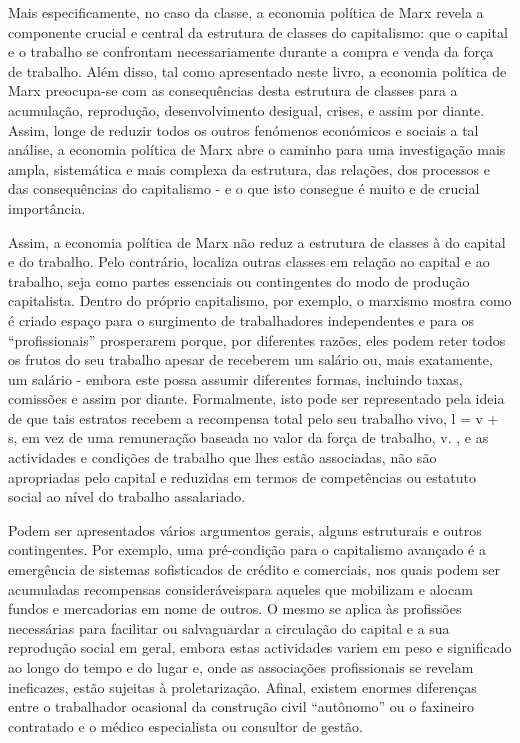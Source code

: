  \par 
Mais especificamente, no caso da classe, a economia política de Marx revela a componente crucial e central da estrutura de classes do capitalismo: que o capital e o trabalho se confrontam necessariamente durante a compra e venda da força de trabalho. Além disso, tal como apresentado neste livro, a economia política de Marx preocupa-se com as consequências desta estrutura de classes para a acumulação, reprodução, desenvolvimento desigual, crises, e assim por diante. Assim, longe de reduzir todos os outros fenómenos económicos e sociais a tal análise, a economia política de Marx abre o caminho para uma investigação mais ampla, sistemática e mais complexa da estrutura, das relações, dos processos e das consequências do capitalismo - e o que isto consegue é muito e de crucial importância.
 \par 
Assim, a economia política de Marx não reduz a estrutura de classes à do capital e do trabalho. Pelo contrário, localiza outras classes em relação ao capital e ao trabalho, seja como partes essenciais ou contingentes do modo de produção capitalista. Dentro do próprio capitalismo, por exemplo, o marxismo mostra como é criado espaço para o surgimento de trabalhadores independentes e para os “profissionais” prosperarem porque, por diferentes razões, eles podem reter todos os frutos do seu trabalho apesar de receberem um salário ou, mais exatamente, um salário - embora este possa assumir diferentes formas, incluindo taxas, comissões e assim por diante. Formalmente, isto pode ser representado pela ideia de que tais estratos recebem a recompensa total pelo seu trabalho vivo, l = v + s, em vez de uma remuneração baseada no valor da força de trabalho, v. , e as actividades e condições de trabalho que lhes estão associadas, não são apropriadas pelo capital e reduzidas em termos de competências ou estatuto social ao nível do trabalho assalariado.
 \par 
Podem ser apresentados vários argumentos gerais, alguns estruturais e outros contingentes. Por exemplo, uma pré-condição para o capitalismo avançado é a emergência de sistemas sofisticados de crédito e comerciais, nos quais podem ser acumuladas recompensas consideráveis ​​para aqueles que mobilizam e alocam fundos e mercadorias em nome de outros. O mesmo se aplica às profissões necessárias para facilitar ou salvaguardar a circulação do capital e a sua reprodução social em geral, embora estas actividades variem em peso e significado ao longo do tempo e do lugar e, onde as associações profissionais se revelam ineficazes, estão sujeitas à proletarização. Afinal, existem enormes diferenças entre o trabalhador ocasional da construção civil “autônomo” ou o faxineiro contratado e o médico especialista ou consultor de gestão.
